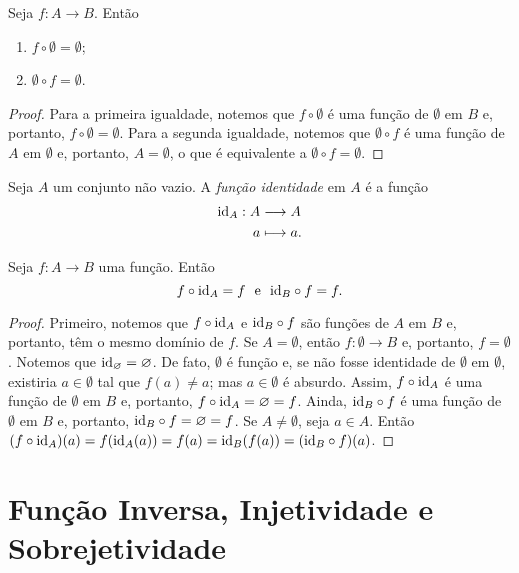 \begin{prop}
	Seja $f: A \to B$. Então
	\begin{enumerate}
	\item $f \circ \emptyset = \emptyset$;
	\item $\emptyset \circ f = \emptyset$.
	\end{enumerate}
\end{prop}
\begin{proof}
	Para a primeira igualdade, notemos que $f \circ \emptyset$ é uma função de $\emptyset$ em $B$ e, portanto, $f \circ \emptyset=\emptyset$. Para a segunda igualdade, notemos que $\emptyset \circ f$ é uma função de $A$ em $\emptyset$ e, portanto, $A=\emptyset$, o que é equivalente a $\emptyset \circ f=\emptyset$.
\end{proof}

\begin{defi}
	Seja $A$ um conjunto não vazio. A \emph{função identidade} em $A$ é a função
	\begin{align*}
	\mathrm{id}_A : A &\longrightarrow A \\
			a &\longmapsto a.
	\end{align*}
\end{defi}

\begin{prop}
\label{prop:id.comp.func}
	Seja $f: A \to B$ uma função. Então
	\begin{equation*}
	f \circ \mathrm{id}_A = f \text{\ \ e\ \ } \mathrm{id}_B \circ f = f.
	\end{equation*}
\end{prop}
\begin{proof}
	Primeiro, notemos que $f \circ \mathrm{id}_A$ e $\mathrm{id}_B \circ f$ são funções de $A$ em $B$ e, portanto, têm o mesmo domínio de $f$. Se $A = \emptyset$, então $f: \emptyset \to B$ e, portanto, $f=\emptyset$. Notemos que $\mathrm{id}_\varnothing = \varnothing$. De fato, $\emptyset$ é função e, se não fosse identidade de $\emptyset$ em $\emptyset$, existiria $a \in \emptyset$ tal que $f(a) \neq a$; mas $a \in \emptyset$ é absurdo. Assim, $f \circ \mathrm{id}_A$ é uma função de $\emptyset$ em $B$ e, portanto, $f \circ \mathrm{id}_A = \varnothing = f$. Ainda, $\mathrm{id}_B \circ f$ é uma função de $\emptyset$ em $B$ e, portanto, $\mathrm{id}_B \circ f = \varnothing = f$. Se $A \neq \emptyset$, seja $a \in A$. Então $(f \circ \mathrm{id}_A) (a) = f(\mathrm{id}_A(a)) = f(a) = \mathrm{id}_B(f(a)) = (\mathrm{id}_B \circ f)(a)$.
\end{proof}

\section{Função Inversa, Injetividade e Sobrejetividade}

